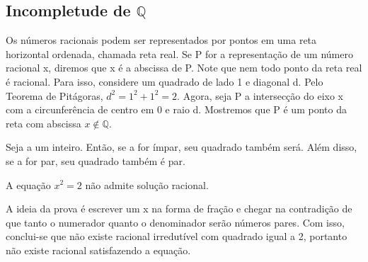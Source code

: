 \documentclass[Analysis/analysis_notes.tex]{subfiles}
\begin{document}
\subsection{Incompletude de $\mathbb{Q}$}
Os n\'umeros racionais podem ser representados por pontos em uma reta horizontal ordenada, chamada reta real. Se P for a representa\c c\~ao
de um n\'umero racional x, diremos que x \'e a abscissa de P. Note que nem todo ponto da reta real \'e racional. Para isso, considere
um quadrado de lado 1 e diagonal d. Pelo Teorema de Pit\'agoras, $d^{2} = 1^2 + 1^2 = 2.$ Agora, seja P a intersec\c c\~ao do eixo
x com a circunfer\^encia de centro em 0 e raio d. Mostremos que P \'e um ponto da reta com abscissa $x\not\in \mathbb{Q}.$
\begin{prop*}
	Seja a um inteiro. Ent\~ao, se a for \'impar, seu quadrado tamb\'em ser\'a. Al\'em disso, se a for par, seu quadrado tamb\'em \'e par.
\end{prop*}
\begin{prop*}
	A equa\c c\~ao $x^2 = 2$ n\~ao admite solu\c c\~ao racional.
\end{prop*}
A ideia da prova \'e escrever um x na forma de fra\c c\~ao e chegar na contradi\c c\~ao de que tanto o numerador quanto o denominador
ser\~ao n\'umeros pares. Com isso, conclui-se que n\~ao existe racional irredut\'ivel com quadrado igual a 2, portanto n\~ao existe racional
satisfazendo a equa\c c\~ao.
\end{document}
